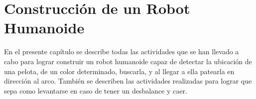 \chapter{Construcci\'on de un Robot Humanoide}\label{chapter:introAdesarrollo}

En el presente capítulo se describe todas las actividades que se han llevado a cabo para lograr construir un robot humanoide capaz de detectar la ubicación de una pelota, de un color determinado, buscarla, y al llegar a ella patearla en direcci\'on al arco. También se describen las actividades realizadas para lograr que sepa como levantarse en caso de tener un desbalance y caer.  



